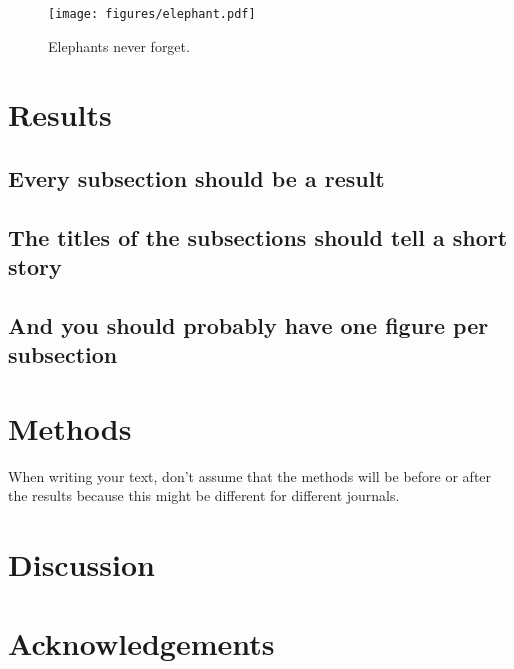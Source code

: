 \documentclass{article}
\begin{document}
\begin{figure}[!htbp]
    \centering
    \texttt{[image: figures/elephant.pdf]}
    \caption{Elephants never forget.}
    \label{fig:elephant}
\end{figure}

\section{Results}\label{sec:results}

\subsection{Every subsection should be a result}

\subsection{The titles of the subsections should tell a short story}

\subsection{And you should probably have one figure per subsection}

\section{Methods}\label{sec:methods}

When writing your text, don't assume that the methods will be before or after the results because this might be different for different journals.

\section{Discussion}\label{sec:discussion}

\section*{Acknowledgements}\label{sec:acknowledgements}



\end{document}
